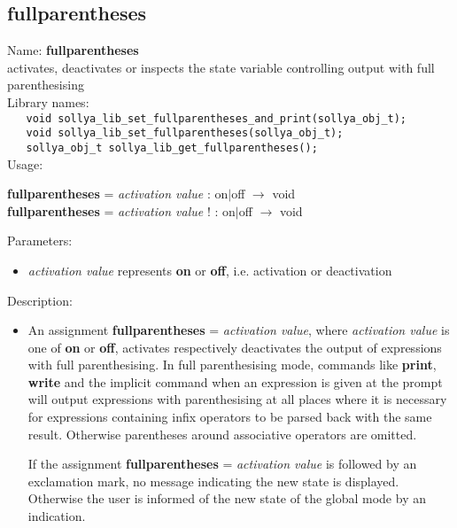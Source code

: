 \subsection{fullparentheses}
\label{labfullparentheses}
\noindent Name: \textbf{fullparentheses}\\
\phantom{aaa}activates, deactivates or inspects the state variable controlling output with full parenthesising\\[0.2cm]
\noindent Library names:\\
\verb|   void sollya_lib_set_fullparentheses_and_print(sollya_obj_t);|\\
\verb|   void sollya_lib_set_fullparentheses(sollya_obj_t);|\\
\verb|   sollya_obj_t sollya_lib_get_fullparentheses();|\\[0.2cm]
\noindent Usage: 
\begin{center}
\textbf{fullparentheses} = \emph{activation value} : \textsf{on$|$off} $\rightarrow$ \textsf{void}\\
\textbf{fullparentheses} = \emph{activation value} ! : \textsf{on$|$off} $\rightarrow$ \textsf{void}\\
\end{center}
Parameters: 
\begin{itemize}
\item \emph{activation value} represents \textbf{on} or \textbf{off}, i.e. activation or deactivation
\end{itemize}
\noindent Description: \begin{itemize}

\item An assignment \textbf{fullparentheses} = \emph{activation value}, where \emph{activation value}
   is one of \textbf{on} or \textbf{off}, activates respectively deactivates the output
   of expressions with full parenthesising. In full parenthesising mode,
   \sollya commands like \textbf{print}, \textbf{write} and the implicit command when an
   expression is given at the prompt will output expressions with
   parenthesising at all places where it is necessary for expressions
   containing infix operators to be parsed back with the same
   result. Otherwise parentheses around associative operators are
   omitted.
    
   If the assignment \textbf{fullparentheses} = \emph{activation value} is followed by an
   exclamation mark, no message indicating the new state is
   displayed. Otherwise the user is informed of the new state of the
   global mode by an indication.
\end{itemize}
